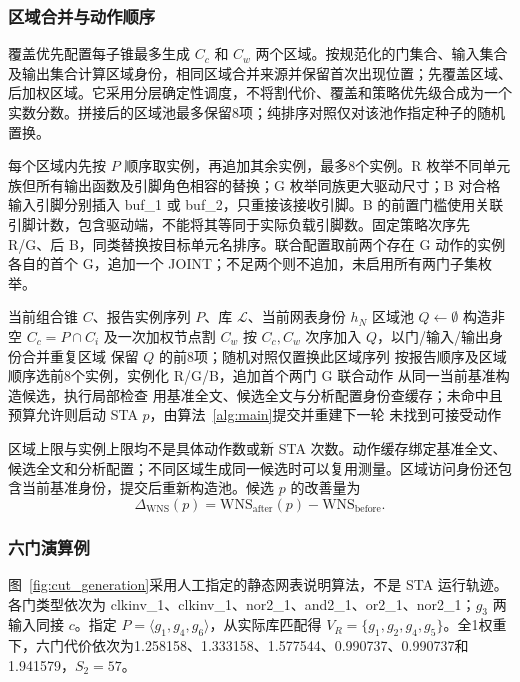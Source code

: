 \documentclass[twocolumn,10pt,fontset=windows]{ctexart}
\renewcommand{\eqref}[1]{\textup{（\ref{#1}）}}
\begin{document}
\subsubsection{区域合并与动作顺序}
覆盖优先配置每子锥最多生成 $C_c$ 和 $C_w$ 两个区域。按规范化的门集合、输入集合及输出集合计算区域身份，相同区域合并来源并保留首次出现位置；先覆盖区域、后加权区域。它采用分层确定性调度，不将割代价、覆盖和策略优先级合成为一个实数分数。拼接后的区域池最多保留8项；纯排序对照仅对该池作指定种子的随机置换。

每个区域内先按 $P$ 顺序取实例，再追加其余实例，最多8个实例。R 枚举不同单元族但所有输出函数及引脚角色相容的替换；G 枚举同族更大驱动尺寸；B 对合格输入引脚分别插入 buf\_1 或 buf\_2，只重接该接收引脚。B 的前置门槛使用关联引脚计数，包含驱动端，不能将其等同于实际负载引脚数。固定策略次序先 R/G、后 B，同类替换按目标单元名排序。联合配置取前两个存在 G 动作的实例各自的首个 G，追加一个 JOINT；不足两个则不追加，未启用所有两门子集枚举。

\begin{algorithm}[htbp]
\footnotesize
\caption{覆盖优先的区域与动作调度}\label{alg:regions}
\begin{algorithmic}[1]
\Require 当前组合锥 $C$、报告实例序列 $P$、库 $\mathcal L$、当前网表身份 $h_N$
\State 区域池 $Q\gets\emptyset$
  \State 构造非空 $C_c=P\cap C_i$ 及一次加权节点割 $C_w$
  \State 按 $C_c,C_w$ 次序加入 $Q$，以门/输入/输出身份合并重复区域
\EndFor
\State 保留 $Q$ 的前8项；随机对照仅置换此区域序列
  \State 按报告顺序及区域顺序选前8个实例，实例化 R/G/B，追加首个两门 G 联合动作
    \State 从同一当前基准构造候选，执行局部检查
    \State 用基准全文、候选全文与分析配置身份查缓存；未命中且预算允许则启动 STA
    \If{$p$ 满足式~\eqref{eq:accept}及启用的物理门控}
      \State \Return $p$，由算法~\ref{alg:main}提交并重建下一轮
    \EndIf
  \EndFor
\EndFor
\State \Return 未找到可接受动作
\end{algorithmic}
\end{algorithm}

区域上限与实例上限均不是具体动作数或新 STA 次数。动作缓存绑定基准全文、候选全文和分析配置；不同区域生成同一候选时可以复用测量。区域访问身份还包含当前基准身份，提交后重新构造池。候选 $p$ 的改善量为
\begin{equation}\label{eq:dtiming}
\Delta_{\mathrm{WNS}}(p)=\mathrm{WNS}_{\mathrm{after}}(p)-\mathrm{WNS}_{\mathrm{before}}.
\end{equation}

\subsubsection{六门演算例}
图~\ref{fig:cut_generation}采用人工指定的静态网表说明算法，不是 STA 运行轨迹。各门类型依次为 clkinv\_1、clkinv\_1、nor2\_1、and2\_1、or2\_1、nor2\_1；$g_3$ 两输入同接 $c$。指定 $P=\langle g_1,g_4,g_6\rangle$，从实际库匹配得 $V_R=\{g_1,g_2,g_4,g_5\}$。全1权重下，六门代价依次为1.258158、1.333158、1.577544、0.990737、0.990737和1.941579，$S_2=57$。
\end{document}
